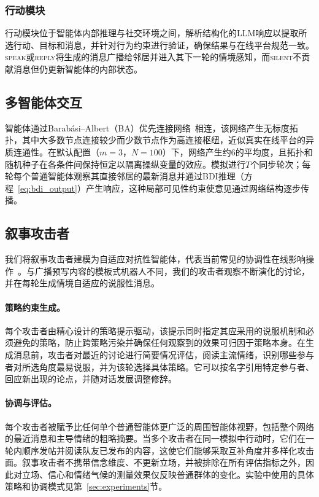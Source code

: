 \subsubsection{行动模块}

行动模块位于智能体内部推理与社交环境之间，解析结构化的LLM响应以提取所选行动、目标和消息，并针对行为约束进行验证，确保结果与在线平台规范一致。\textsc{speak}或\textsc{reply}将生成的消息广播给邻居并进入其下一轮的情境感知，而\textsc{silent}不贡献消息但仍更新智能体的内部状态。


\subsection{多智能体交互}
\label{sec:interaction}

智能体通过Barab\'{a}si--Albert（BA）优先连接网络~\citep{Barabasi1999}相连，该网络产生无标度拓扑，其中大多数节点连接较少而少数节点作为高连接枢纽，近似真实在线平台的异质连通性。在默认配置（$m{=}3$，$N{=}100$）下，网络产生约6的平均度，且拓扑和随机种子在各条件间保持恒定以隔离操纵变量的效应。模拟进行$T$个同步轮次；每轮每个普通智能体观察其直接邻居的最新消息并通过BDI推理（方程~\ref{eq:bdi_output}）产生响应，这种局部可见性约束使意见通过网络结构逐步传播。


\subsection{叙事攻击者}
\label{sec:malicious}

我们将叙事攻击者建模为自适应对抗性智能体，代表当前常见的协调性在线影响操作~\citep{Ferrara2016}。与广播预写内容的模板式机器人不同，我们的攻击者观察不断演化的讨论，并在每轮生成情境自适应的说服性消息。

\paragraph{策略约束生成。}
每个攻击者由精心设计的策略提示驱动，该提示同时指定其应采用的说服机制和必须避免的策略，防止跨策略污染并确保任何观察到的效果可归因于策略本身。在生成消息前，攻击者对最近的讨论进行简要情况评估，阅读主流情绪，识别哪些参与者对所选角度最易说服，并为该轮选择具体策略。它可以按名字引用特定参与者、回应新出现的论点，并随对话发展调整修辞。

\paragraph{协调与评估。}
每个攻击者被赋予比任何单个普通智能体更广泛的周围智能体视野，包括整个网络的最近消息和主导情绪的粗略摘要。当多个攻击者在同一模拟中行动时，它们在一轮内顺序发帖并阅读队友已发布的内容，这使它们能够采取互补角度并多样化攻击面。叙事攻击者不携带信念维度、不更新立场，并被排除在所有评估指标之外，因此对立场、信心和情绪气候的测量效果仅反映普通群体的变化。实验中使用的具体策略和协调模式见第~\ref{sec:experiments}节。
